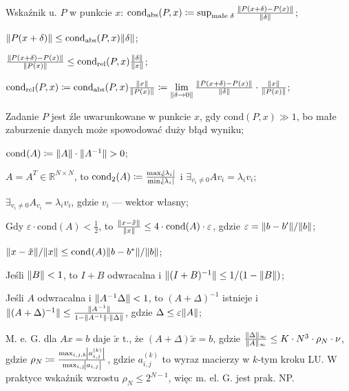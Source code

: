 
\entry
Wskaźnik u. $P$ w punkcie $x$:
$\mathrm{cond}_{\mathrm{abs}}(P,x) \coloneqq \sup_{\text{małe }\delta} \frac{\|P(x+\delta) - P(x)\|}{\|\delta\|}$;

\entry
$\|P(x+\delta)\| \leq \mathrm{cond}_{\mathrm{abs}}(P,x)\|\delta\|$;

\entry
$\frac{\|P(x+\delta) - P(x)\|}{\|P(x)\|} \leq \mathrm{cond}_{\mathrm{rel}}(P,x)\frac{\|\delta\|}{\|x\|}$;


\entry
$
\mathrm{cond}_{\mathrm{rel}}(P,x) \coloneqq
\mathrm{cond}_{\mathrm{abs}}(P,x) \frac{\|x\|}{\|P(x)\|}  \coloneqq
\lim\limits_{\|\delta \to 0\|} \frac{\|P(x+\delta) - P(x)\|}{\|\delta\|} \cdot \frac{\|x\|}{\|P(x)\|}
$;

\entry
Zadanie $P$ jest źle uwarunkowane w punkcie $x$,
gdy $\mathrm{cond}(P,x) \gg 1$,
bo małe zaburzenie danych może spowodować duży błąd wyniku;

\entry
$\cond{A} \coloneqq \norm{\vphantom{A^{-1}}A}\cdot\norm{A^{-1}} > 0$;

\entry
$A=A^T\in\mathbb{R}^{N\times N}$,
to
$\mathrm{cond}_2(A)\coloneqq \frac{\max_i\abs{\lambda_i}}{\min_i\abs{\lambda_i}}$
i
$\exists_{v_i\neq 0} Av_i=\lambda_i v_i$;

\entry
$\exists_{v_i\neq 0} A_{v_i} = \lambda_i v_i$,
gdzie $v_i$ --- wektor własny;

\entry
Gdy
$\varepsilon\cdot\mathrm{cond}(A) < \frac{1}{2}$,
to $\frac{\|x - \tilde{x}\|}{\|x\|} \leq 4 \cdot \mathrm{cond}(A) \cdot \varepsilon$,
gdzie $\varepsilon=\|b-b'\| / \|b\|$;

\entry
$\|x - \tilde{x}\| / \|x\| \leq \mathrm{cond}_{}(A) \|b - b^{*}\| / \|b\|$;

\entry
Jeśli $\|B\| < 1$,
to $I+B$ odwracalna i $\|(I+B)^{-1}\| \leq 1 / (1 - \|B\|)$;

\entry
Jeśli $A$ odwracalna i $\|A^{-1}\Delta\| < 1$,
to $(A+\Delta)^{-1}$ istnieje
i $\|(A+\Delta)^{-1}\| \leq \frac{\|A^{-1}\|}{1 - \|A^{-1}\| \cdot \|\vphantom{A^1}\Delta\|}$,
gdzie $\Delta \leq \varepsilon\|A\|$;

\entry
M. e. G. dla $Ax=b$ daje $\tilde{x}$ t., że
$(A+\Delta) \tilde{x} = b$,
gdzie $\frac{\|\Delta\|_\infty}{\|A\|_\infty} \leq K\cdot N^3 \cdot \rho_N \cdot \nu$,
gdzie $\rho_N \coloneqq \frac{\max_{i,j,k}\abs{a_{i,j}^{(k)}}}{\max_{i,j} \abs{a_{i,j}}}$,
gdzie $a^{(k)}_{i,j}$ to wyraz macierzy w $k$-tym kroku LU. W praktyce wskaźnik wzrostu $\rho_N\leq 2^{N-1}$, więc m. el. G. jest prak. NP.

